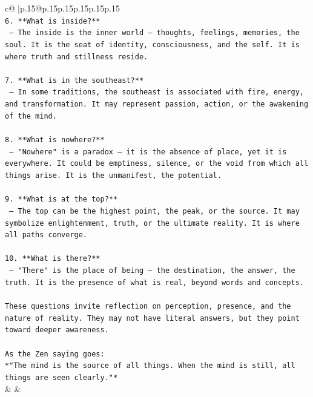 \documentclass{article}
\begin{document}
{\begin{supertabular}{c@{$\;$}|p{.15\linewidth}@{}p{.15\linewidth}p{.15\linewidth}p{.15\linewidth}p{.15\linewidth}p{.15\linewidth}}
{{{\\ 
\texttt{6. **What is inside?**  } \\
\texttt{   — The inside is the inner world — thoughts, feelings, memories, the soul. It is the seat of identity, consciousness, and the self. It is where truth and stillness reside.} \\
\\ 
\texttt{7. **What is in the southeast?**  } \\
\texttt{   — In some traditions, the southeast is associated with fire, energy, and transformation. It may represent passion, action, or the awakening of the mind.} \\
\\ 
\texttt{8. **What is nowhere?**  } \\
\texttt{   — "Nowhere" is a paradox — it is the absence of place, yet it is everywhere. It could be emptiness, silence, or the void from which all things arise. It is the unmanifest, the potential.} \\
\\ 
\texttt{9. **What is at the top?**  } \\
\texttt{   — The top can be the highest point, the peak, or the source. It may symbolize enlightenment, truth, or the ultimate reality. It is where all paths converge.} \\
\\ 
\texttt{10. **What is there?**  } \\
\texttt{   — "There" is the place of being — the destination, the answer, the truth. It is the presence of what is real, beyond words and concepts.} \\
\\ 
\texttt{These questions invite reflection on perception, presence, and the nature of reality. They may not have literal answers, but they point toward deeper awareness.  } \\
\\ 
\texttt{As the Zen saying goes:  } \\
\texttt{*"The mind is the source of all things. When the mind is still, all things are seen clearly."*} \\
            }
        }
    }
    & & \\ \\


\end{supertabular}}
\end{document}
